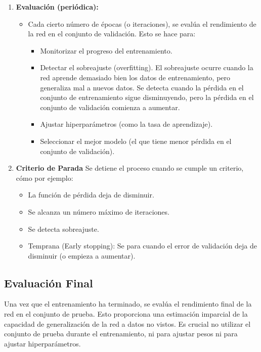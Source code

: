 \documentclass{article}
\begin{document}
\begin{enumerate}
    \item \textbf{Evaluación (periódica):}
        \begin{itemize}
            \item Cada cierto número de épocas (o iteraciones), se evalúa el rendimiento de la red en el conjunto de validación.  Esto se hace para:
                \begin{itemize}
                    \item Monitorizar el progreso del entrenamiento.
                    \item Detectar el sobreajuste (overfitting). El sobreajuste ocurre cuando la red aprende demasiado bien los datos de entrenamiento, pero generaliza mal a nuevos datos.  Se detecta cuando la pérdida en el conjunto de entrenamiento sigue disminuyendo, pero la pérdida en el conjunto de validación comienza a aumentar.
                    \item Ajustar hiperparámetros (como la tasa de aprendizaje).
                    \item Seleccionar el mejor modelo (el que tiene menor pérdida en el conjunto de validación).
                \end{itemize}
        \end{itemize}
    \item \textbf{Criterio de Parada} Se detiene el proceso cuando se cumple un criterio, cómo por ejemplo:
        \begin{itemize}
            \item La función de pérdida deja de disminuir.
            \item Se alcanza un número máximo de iteraciones.
            \item Se detecta sobreajuste.
            \item Temprana (Early stopping): Se para cuando el error de validación deja de disminuir (o empieza a aumentar).
        \end{itemize}
\end{enumerate}
\subsection{Evaluación Final}

Una vez que el entrenamiento ha terminado, se evalúa el rendimiento final de la red en el conjunto de prueba.  Esto proporciona una estimación imparcial de la capacidad de generalización de la red a datos no vistos. Es crucial no utilizar el conjunto de prueba durante el entrenamiento, ni para ajustar pesos ni para ajustar hiperparámetros.
\end{document}
